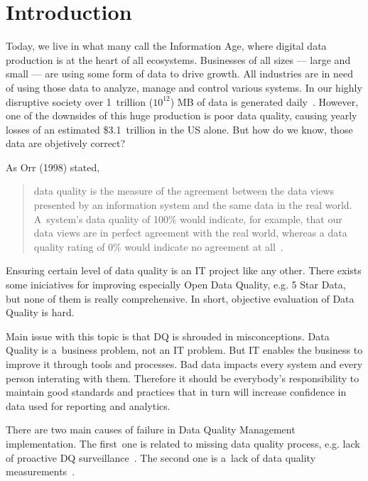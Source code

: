 \chapter{Introduction}\label{ch:introduction}

Today, we live in what many call the Information Age, where digital data production is at the heart of all ecosystems.
Businesses of all sizes — large and small — are using some form of data to drive growth.
All industries are in need of using those data to analyze, manage and control various systems.
In our highly disruptive society over 1~trillion (\( 10^{12} \)) MB of data is generated daily~\cite{techjury2021}.
However, one of the downsides of this huge production is poor data quality, causing yearly losses of an estimated \$3.1~trillion in the US alone.
But how do we know, those data are objetively correct?

As Orr (1998) stated,
\blockquote[][]{data quality is the measure of the agreement between the data views presented by an information system and the same data in the real world.
A~system's data quality of 100\% would indicate, for example, that our data views are in perfect agreement with the real world, whereas a data quality rating of 0\% would indicate no agreement at all~\cite{orr1998}.}

Ensuring certain level of data quality is an IT project like any other.
There exists some iniciatives for improving especially Open Data Quality, e.g. 5 Star Data, but none of them is really comprehensive.
In short, objective evaluation of Data Quality is hard.

Main issue with this topic is that DQ is shrouded in misconceptions.
Data Quality is a~business problem, not an IT problem.
But IT enables the business to improve it through tools and processes.
Bad data impacts every system and every person interating with them.
Therefore it should be everybody's responsibility to maintain good standards and practices that in turn will increase confidence in data used for reporting and analytics.

There are two main causes of failure in Data Quality Management implementation.
The first~one is related to missing data quality process, e.g. lack of proactive DQ surveillance~\cite{risto2011}.
The second one is a~lack of data quality measurements~\cite{haug2013}.


